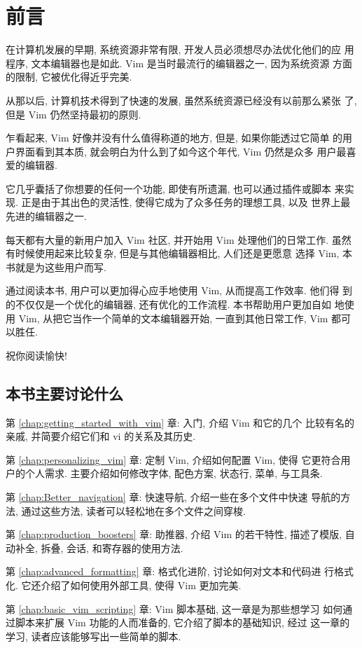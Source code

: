 \chapter{前言}
\label{chap:preface}
在计算机发展的早期, 系统资源非常有限, 开发人员必须想尽办法优化他们的应
用程序, 文本编辑器也是如此. Vim 是当时最流行的编辑器之一, 因为系统资源
方面的限制, 它被优化得近乎完美.

从那以后, 计算机技术得到了快速的发展, 虽然系统资源已经没有以前那么紧张
了, 但是 Vim 仍然坚持最初的原则.

乍看起来, Vim 好像并没有什么值得称道的地方, 但是, 如果你能透过它简单
的用户界面看到其本质, 就会明白为什么到了如今这个年代, Vim 仍然是众多
用户最喜爱的编辑器.

它几乎囊括了你想要的任何一个功能, 即使有所遗漏, 也可以通过插件或脚本
来实现. 正是由于其出色的灵活性, 使得它成为了众多任务的理想工具, 以及
世界上最先进的编辑器之一.

每天都有大量的新用户加入 Vim 社区, 并开始用 Vim 处理他们的日常工作.
虽然有时候使用起来比较复杂, 但是与其他编辑器相比, 人们还是更愿意
选择 Vim, 本书就是为这些用户而写.

通过阅读本书, 用户可以更加得心应手地使用 Vim, 从而提高工作效率. 他们得
到的不仅仅是一个优化的编辑器, 还有优化的工作流程. 本书帮助用户更加自如
地使用 Vim, 从把它当作一个简单的文本编辑器开始, 一直到其他日常工作, Vim 
都可以胜任.

祝你阅读愉快!

\section*{本书主要讨论什么}
第 \ref{chap:getting_started_with_vim} 章: 入门, 介绍 Vim 和它的几个
比较有名的亲戚, 并简要介绍它们和 vi 的关系及其历史.

第 \ref{chap:personalizing_vim} 章: 定制 Vim, 介绍如何配置 Vim, 使得 
它更符合用户的个人需求. 主要介绍如何修改字体, 配色方案, 状态行, 菜单,
与工具条.

第 \ref{chap:Better_navigation} 章: 快速导航, 介绍一些在多个文件中快速
导航的方法, 通过这些方法, 读者可以轻松地在多个文件之间穿梭.

第 \ref{chap:production_boosters} 章: 助推器, 介绍 Vim 的若干特性, 
描述了模版, 自动补全, 拆叠, 会话, 和寄存器的使用方法.

第 \ref{chap:advanced_formatting} 章: 格式化进阶, 讨论如何对文本和代码进
行格式化. 它还介绍了如何使用外部工具, 使得 Vim 更加完美.

第 \ref{chap:basic_vim_scripting} 章: Vim 脚本基础, 这一章是为那些想学习
如何通过脚本来扩展 Vim 功能的人而准备的, 它介绍了脚本的基础知识, 经过
这一章的学习, 读者应该能够写出一些简单的脚本.

